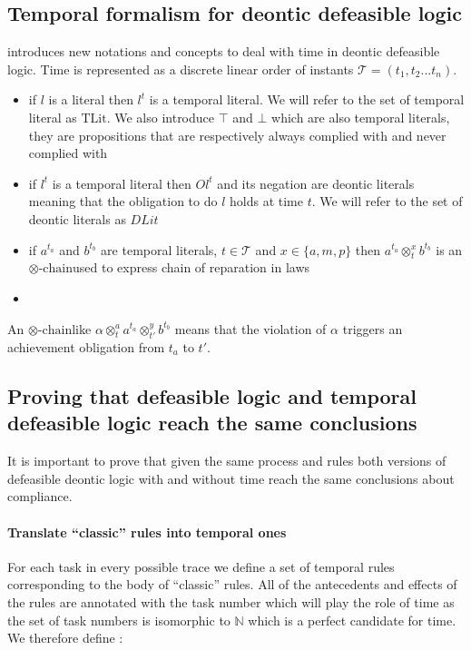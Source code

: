 \documentclass[10pt]{report}
\newcommand{\ochain}{$\otimes \text{-chain}$}
\begin{document}
\subsection{Temporal formalism for deontic defeasible logic}

\autocite{JusticeDelayed2011} introduces new notations and concepts to deal with time in deontic defeasible logic. Time is represented as a discrete linear order of instants $ \mathscr{T} = (t_{1}, t_{2} ... t_{n})$.
\begin{itemize}
\item if $l$ is a literal then $l^{t}$ is a temporal literal. We will refer to the set of temporal literal as $\text{TLit}$. We also introduce $\top$ and $\bot$ which are also temporal literals, they are propositions that are respectively always complied with and never complied with
\item if $l^{t}$ is a temporal literal then $Ol^{t}$ and its negation are deontic literals meaning that the obligation to do $l$ holds at time $t$. We will refer to the set of deontic literals as $DLit$
\item if $a^{t_{a}}$ and $b^{t_{b}}$ are temporal literals, $t \in \mathscr{T}$ and $x \in \{a,m,p\}$ then $a^{t_{a}} \otimes^{x}_{t} b^{t_{b}}$ is an \ochain used to express chain of reparation in laws
\item 
\end{itemize} 


An \ochain like $\alpha \otimes^{a}_{t} a^{t_{a}} \otimes^{y}_{t'} b^{t_{b}}$ means that the violation of $\alpha$ triggers an achievement obligation from $t_{a}$ to $t'$.

\subsection{Proving that defeasible logic and temporal defeasible logic reach the same conclusions}

It is important to prove that given the same process and rules both versions of defeasible deontic logic with and without time reach the same conclusions about compliance.

\paragraph{Translate \enquote{classic} rules into temporal ones}

For each task in every possible trace we define a set of temporal rules corresponding to the body of \enquote{classic} rules. All of the antecedents and effects of the rules are annotated with the task number which will play the role of time as the set of task numbers is isomorphic to $\mathbb{N}$ which is a perfect candidate for time. We therefore define :
\end{document}
